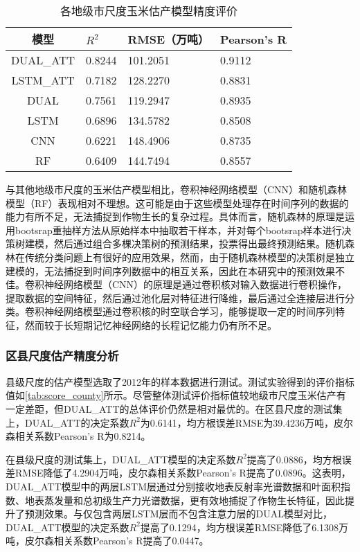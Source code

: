 \begin{table}
  \centering
  \caption{各地级市尺度玉米估产模型精度评价}
  \label{tab:score_city}
  \begin{tabularx}{\linewidth}{cX<{\centering}X<{\centering}X<{\centering}}
      \toprule
      模型 & $R^2$ & RMSE（万吨） & Pearson's R \\
      \midrule
      DUAL\_ATT & 0.8244 & 101.2051 & 0.9112 \\
      LSTM\_ATT & 0.7182 & 128.2270 & 0.8831 \\
      DUAL & 0.7561 & 119.2947 & 0.8935 \\
      LSTM & 0.6896 & 134.5782 & 0.8508 \\
      CNN & 0.6221 & 148.4906 & 0.8735 \\
      RF & 0.6409 & 144.7494 & 0.8557 \\ 
      \bottomrule
  \end{tabularx}
\end{table}

\par 与其他地级市尺度的玉米估产模型相比，卷积神经网络模型（CNN）和随机森林模型（RF）表现相对不理想。这可能是由于这些模型处理存在时间序列的数据的能力有所不足，无法捕捉到作物生长的复杂过程。具体而言，随机森林的原理是运用bootsrap重抽样方法从原始样本中抽取若干样本，并对每个bootsrap样本进行决策树建模，然后通过组合多棵决策树的预测结果，投票得出最终预测结果\cite{方匡南2011随机森林方法研究综述}。随机森林在传统分类问题上有很好的应用效果，然而，由于随机森林模型的决策树是独立建模的，无法捕捉到时间序列数据中的相互关系，因此在本研究中的预测效果不佳。卷积神经网络模型（CNN）的原理是通过卷积核对输入数据进行卷积操作，提取数据的空间特征，然后通过池化层对特征进行降维，最后通过全连接层进行分类\cite{周飞燕2017卷积神经网络研究综述}。卷积神经网络模型通过卷积核的时空联合学习，能够提取一定的时间序列特征，然而较于长短期记忆神经网络的长程记忆能力仍有所不足。

\subsubsection{区县尺度估产精度分析}
\par 县级尺度的估产模型选取了2012年的样本数据进行测试。测试实验得到的评价指标值如\autoref{tab:score_county}所示。尽管整体测试评价指标值较地级市尺度玉米估产有一定差距，但DUAL\_ATT的总体评价仍然是相对最优的。在区县尺度的测试集上，DUAL\_ATT的决定系数$R^2$为0.6141，均方根误差RMSE为39.4236万吨，皮尔森相关系数Pearson's R为0.8214。

\par 在县级尺度的测试集上，DUAL\_ATT模型的决定系数$R^2$提高了0.0886，均方根误差RMSE降低了4.2904万吨，皮尔森相关系数Pearson's R提高了0.0896。这表明，DUAL\_ATT模型中的两层LSTM层通过分别接收地表反射率光谱数据和叶面积指数、地表蒸发量和总初级生产力光谱数据，更有效地捕捉了作物生长特征，因此提升了预测效果。与仅包含两层LSTM层而不包含注意力层的DUAL模型对比，DUAL\_ATT模型的决定系数$R^2$提高了0.1294，均方根误差RMSE降低了6.1308万吨，皮尔森相关系数Pearson's R提高了0.0447。

